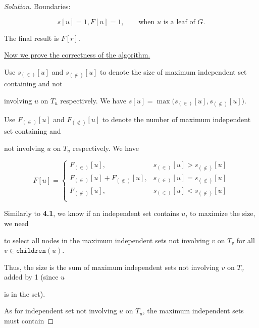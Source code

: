 \documentclass{article}
\newenvironment{solution}{\begin{proof}[\noindent\it Solution]}{\end{proof}}
\begin{document}
\begin{solution}
    \hspace{2.6em}
    Boundaries:
    
    \vspace{-1.5em}
    $$s[u]=1, F[u]=1,\qquad\text{when $u$ is a leaf of $G$.}$$
    
    \hspace{2.6em}
    The final result is $F[r]$.
    
    \vspace{1em}\hspace{2.6em}
    \underline{Now we prove the correctness of the algorithm.}
    
    \hspace{2.6em}
    Use $s_{(\in)}[u]$ and $s_{(\notin)}[u]$ to denote the size of maximum independent set containing and not 
    
    involving $u$ on $T_u$ respectively. We have $s[u]=\max\Big(s_{(\in)}[u],s_{(\notin)}[u]\Big)$.
    
    \hspace{2.6em}
    Use $F_{(\in)}[u]$ and $F_{(\notin)}[u]$ to denote the number of maximum independent set containing and 
    
    not involving $u$ on $T_u$ respectively. We have
    
    \vspace{-1em}
    $$F[u]=\left\{\begin{array}{ll}
        F_{(\in)}[u], & s_{(\in)}[u]>s_{(\notin)}[u] \\
        F_{(\in)}[u]+F_{(\notin)}[u], & s_{(\in)}[u]=s_{(\notin)}[u] \\
        F_{(\notin)}[u], & s_{(\in)}[u]<s_{(\notin)}[u] \\
    \end{array}\right.$$
    
    \vspace{2em} \hspace{2.6em}
    Similarly to \textbf{4.1}, we know if an independent set contains $u$, to maximize the size, we need
    
    to select all nodes in the maximum independent sets not involving $v$ on $T_v$ for all $v\in\mathtt{children}(u)$. 
    
    Thus, the size is the sum of maximum independent sets not involving $v$ on $T_v$ added by 1 (since $u$
    
    is in the set). 
    
    \hspace{2.6em}
    As for independent set not involving $u$ on $T_u$, the maximum independent sets must contain
    

\end{solution}
\end{document}
